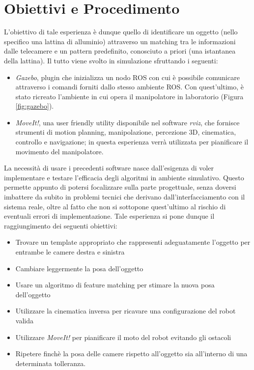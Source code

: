 \documentclass[english]{article}
\begin{document}
\section{Obiettivi e Procedimento}
L'obiettivo di tale esperienza è dunque quello di identificare un oggetto (nello specifico una lattina di alluminio) attraverso un matching tra le informazioni dalle telecamere e un pattern predefinito, conosciuto a priori (una istantanea della lattina). Il tutto viene svolto in simulazione sfruttando i seguenti:
\begin{itemize}
\item \textit{Gazebo}, plugin che inizializza un nodo ROS con cui è possibile comunicare attraverso i comandi forniti dallo stesso ambiente ROS. Con quest'ultimo, è stato ricreato l'ambiente in cui opera il manipolatore in laboratorio (Figura \ref{fig:gazebo}).
\item \textit{MoveIt!}, una user friendly utility disponibile nel software \textit{rviz}, che fornisce strumenti di motion planning, manipolazione, percezione 3D, cinematica, controllo e navigazione; in questa esperienza verrà utilizzata per pianificare il movimento del manipolatore.
\end{itemize}
La necessità di usare i precedenti software nasce dall'esigenza di voler implementare e testare l'efficacia degli algoritmi in ambiente simulativo. Questo permette appunto di potersi focalizzare sulla parte progettuale, senza doversi imbattere da subito in problemi tecnici che derivano dall'interfacciamento con il sistema reale, oltre al fatto che non si sottopone quest'ultimo al rischio di eventuali errori di implementazione. Tale esperienza si pone dunque il raggiungimento dei seguenti obiettivi:
\begin{itemize}
\item Trovare un template appropriato che rappresenti adeguatamente l'oggetto per entrambe le camere destra e sinistra
\item Cambiare leggermente la posa dell'oggetto
\item Usare un algoritmo di feature matching per stimare la nuova posa dell'oggetto 
\item Utilizzare la cinematica inversa per ricavare una configurazione del robot valida
\item Utilizzare \textit{MoveIt!} per pianificare il moto del robot evitando gli ostacoli
\item Ripetere finchè la posa delle camere rispetto all'oggetto sia all'interno di una determinata tolleranza.
\end{itemize}
\end{document}
